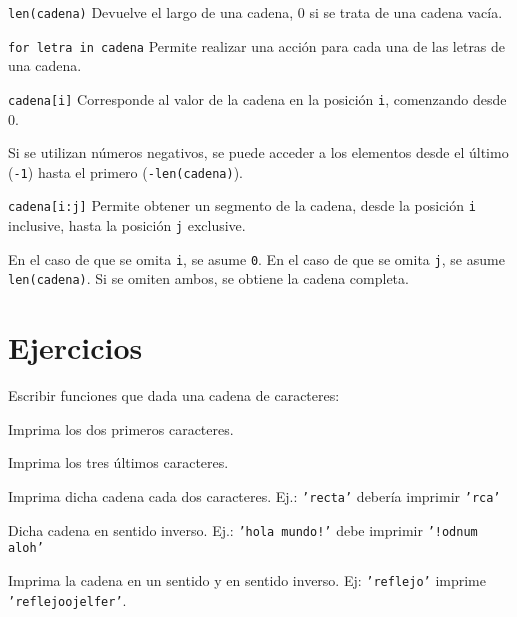 \begin{referencia_python}

\begin{sintaxis}{\lstinline!len(cadena)!}
Devuelve el largo de una cadena, 0 si se trata de una cadena vacía.
\end{sintaxis}

\begin{sintaxis}{\lstinline!for letra in cadena!}
Permite realizar una acción para cada una de las letras de una cadena.
\end{sintaxis}

\begin{sintaxis}{\lstinline!cadena[i]!}
Corresponde al valor de la cadena en la posición \lstinline!i!, comenzando
desde 0.

Si se utilizan números negativos, se puede acceder a los
elementos desde el último (\lstinline!-1!) hasta el primero
(\lstinline!-len(cadena)!).
\end{sintaxis}

\begin{sintaxis}{\lstinline!cadena[i:j]!}
Permite obtener un segmento de la cadena, desde la posición \lstinline!i!
inclusive, hasta la posición \lstinline!j! exclusive.

En el caso de que se omita \lstinline!i!, se asume \lstinline!0!.  En el
caso de que se omita \lstinline!j!, se asume \lstinline!len(cadena)!.  Si
se omiten ambos, se obtiene la cadena completa.
\end{sintaxis}

\end{referencia_python}


\newpage
\section{Ejercicios}

\begin{ejercicio}
Escribir funciones que dada una cadena de caracteres:
\begin{partes}
\item Imprima los dos primeros caracteres.
\item Imprima los tres últimos caracteres.
\item Imprima dicha cadena cada dos caracteres. Ej.: \texttt{'recta'} debería
imprimir \texttt{'rca'}
\item Dicha cadena en sentido inverso. Ej.: \texttt{'hola mundo!'} debe
imprimir \texttt{'!odnum aloh'}
\item Imprima la cadena en un sentido y en sentido inverso. Ej:
\texttt{'reflejo'} imprime \texttt{'reflejoojelfer'}.
\end{partes}
\end{ejercicio}


